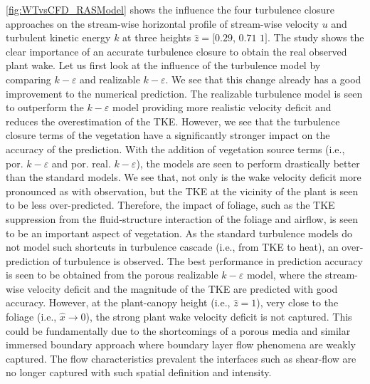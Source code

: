 \cref{fig:WTvsCFD_RASModel} shows the influence the four turbulence closure approaches on the stream-wise horizontal profile of stream-wise velocity $u$ and turbulent kinetic energy $k$ at three heights $\hat{z} = [0.29$, $0.71$ $1]$. The study shows the clear importance of an accurate turbulence closure to obtain the real observed plant wake. Let us first look at the influence of the turbulence model by comparing $k-\varepsilon$ and realizable $k-\varepsilon$. We see that this change already has a good improvement to the numerical prediction. The realizable turbulence model is seen to outperform the $k-\varepsilon$ model providing more realistic velocity deficit and reduces the overestimation of the TKE. However, we see that the turbulence closure terms of the vegetation have a significantly stronger impact on the accuracy of the prediction. With the addition of vegetation source terms (i.e., por. $k-\varepsilon$ and por. real. $k-\varepsilon$), the models are seen to perform drastically better than the standard models. We see that, not only is the wake velocity deficit more pronounced as with observation, but the TKE at the vicinity of the plant is seen to be less over-predicted. Therefore, the impact of foliage, such as the TKE suppression from the fluid-structure interaction of the foliage and airflow, is seen to be an important aspect of vegetation. As the standard turbulence models do not model such shortcuts in turbulence cascade (i.e., from TKE to heat), an over-prediction of turbulence is observed. The best performance in prediction accuracy is seen to be obtained from the porous realizable $k-\varepsilon$ model, where the stream-wise velocity deficit and the magnitude of the TKE are predicted with good accuracy. However, at the plant-canopy height (i.e., $\hat{z} = 1$), very close to the foliage (i.e., $\hat{x} \rightarrow 0$), the strong plant wake velocity deficit is not captured. This could be fundamentally due to the shortcomings of a porous media and similar immersed boundary approach where boundary layer flow phenomena are weakly captured. The flow characteristics prevalent the interfaces such as shear-flow are no longer captured with such spatial definition and intensity. 


